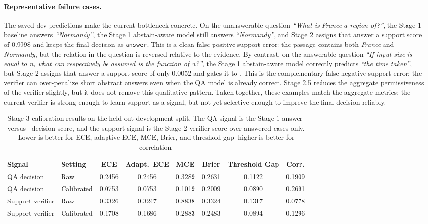 \paragraph{Representative failure cases.}
The saved dev predictions make the current bottleneck concrete.
On the unanswerable question \emph{``What is France a region of?''}, the Stage 1
baseline answers \emph{``Normandy''}, the Stage 1 abstain-aware model still
answers \emph{``Normandy''}, and Stage 2 assigns that answer a support score of
0.9998 and keeps the final decision as \texttt{answer}.
This is a clean false-positive support error: the passage contains both
\emph{France} and \emph{Normandy}, but the relation in the question is reversed
relative to the evidence.
By contrast, on the answerable question \emph{``If input size is equal to n,
what can respectively be assumed is the function of n?''}, the Stage 1
abstain-aware model correctly predicts \emph{``the time taken''}, but Stage 2
assigns that answer a support score of only 0.0052 and gates it to
\abstain.
This is the complementary false-negative support error:
the verifier can over-penalize short abstract answers even when the QA model is
already correct.
Stage 2.5 reduces the aggregate permissiveness of the verifier slightly, but it
does not remove this qualitative pattern.
Taken together, these examples match the aggregate metrics:
the current verifier is strong enough to learn support as a signal, but not yet
selective enough to improve the final decision reliably.

\begin{table}[t]
  \centering
  \caption{Stage 3 calibration results on the held-out development split.
  The QA signal is the Stage 1 answer-versus-\abstain\ decision score, and the
  support signal is the Stage 2 verifier score over answered cases only.
  Lower is better for ECE, adaptive ECE, MCE, Brier, and threshold gap;
  higher is better for correlation.}
  \label{tab:stage3-calibration-results}
  \small
  \setlength{\tabcolsep}{7pt}
  \renewcommand{\arraystretch}{1.1}
  \begin{tabular}{@{}llcccccc@{}}
    \toprule
    Signal & Setting & ECE & Adapt.\ ECE & MCE & Brier & Threshold Gap & Corr. \\
    \midrule
    QA decision & Raw & 0.2456 & 0.2456 & 0.3289 & 0.2631 & 0.1122 & 0.1909 \\
    QA decision & Calibrated & 0.0753 & 0.0753 & 0.1019 & 0.2009 & 0.0890 & 0.2691 \\
    Support verifier & Raw & 0.3326 & 0.3247 & 0.8838 & 0.3324 & 0.1317 & 0.0778 \\
    Support verifier & Calibrated & 0.1708 & 0.1686 & 0.2883 & 0.2483 & 0.0894 & 0.1296 \\
    \bottomrule
  \end{tabular}
\end{table}

